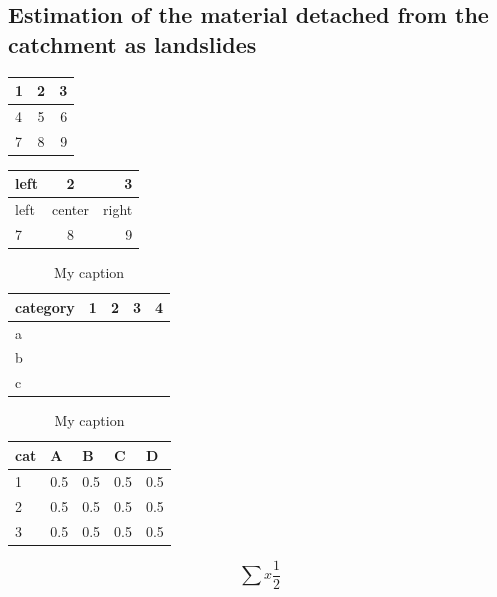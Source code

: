 \documentclass[preprint,12pt]{elsarticle}
\begin{document}
\subsection{Estimation of the material detached from the catchment as landslides}

\begin{tabular}{ l | c | r }
  1 & 2 & 3 \\ \hline
  4 & 5 & 6 \\
  7 & 8 & 9 \\
\end{tabular}


\begin{tabular}{ l | c | r }
\hline
  left & 2 & 3 \\ \hline
  left & center & right \\
  7 & 8 & 9 \\
\hline
\end{tabular}

\begin{table}[]
\centering

\label{my-label}
\begin{tabular}{lllll}
category & 1 & 2 & 3 & 4 \\ \hline
a        &   &   &   &   \\
b        &   &   &   &   \\
c        &   &   &   &  
\end{tabular}
\caption{My caption}
\end{table}

\begin{table}[]
\centering
\caption{My caption}
\label{my-label}
\begin{tabular}{lllll}
\hline
cat & A   & B   & C   & D   \\ \hline
1   & 0.5 & 0.5 & 0.5 & 0.5 \\
2   & 0.5 & 0.5 & 0.5 & 0.5 \\
3   & 0.5 & 0.5 & 0.5 & 0.5 \\ \hline
\end{tabular}
\end{table}

\begin{equation}
\sum x \frac{1}{2} 
\end{equation}




\end{document}
